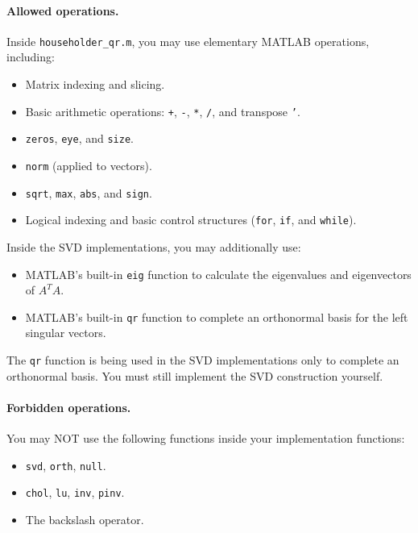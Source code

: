 \documentclass{ximera}
\begin{document}
\paragraph{Allowed operations.}

Inside \texttt{householder\_qr.m}, you may use elementary MATLAB
operations, including:

\begin{itemize}
    \item Matrix indexing and slicing.
    \item Basic arithmetic operations: \texttt{+}, \texttt{-},
    \texttt{*}, \texttt{/}, and transpose \texttt{'}.
    \item \texttt{zeros}, \texttt{eye}, and \texttt{size}.
    \item \texttt{norm} (applied to vectors).
    \item \texttt{sqrt}, \texttt{max}, \texttt{abs}, and
    \texttt{sign}.
    \item Logical indexing and basic control structures
    (\texttt{for}, \texttt{if}, and \texttt{while}).
\end{itemize}

Inside the SVD implementations, you may additionally use:

\begin{itemize}
    \item MATLAB's built-in \texttt{eig} function to calculate
    the eigenvalues and eigenvectors of $A^TA$.
    \item MATLAB's built-in \texttt{qr} function to complete
    an orthonormal basis for the left singular vectors.
\end{itemize}

The \texttt{qr} function is being used in the SVD implementations
only to complete an orthonormal basis. You must still implement
the SVD construction yourself.

\paragraph{Forbidden operations.}

You may NOT use the following functions inside your implementation
functions:

\begin{itemize}
    \item \texttt{svd}, \texttt{orth}, \texttt{null}.
    \item \texttt{chol}, \texttt{lu}, \texttt{inv}, \texttt{pinv}.
    \item The backslash operator.
\end{itemize}
\end{document}
